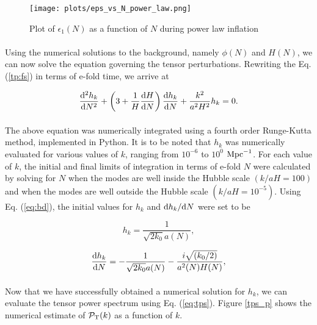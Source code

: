 \documentclass[12pt,a4paper,oneside]{book}
\begin{document}
\begin{figure}
\begin{center}
\texttt{[image: plots/eps\_vs\_N\_power\_law.png]}
\caption[Plot of $\epsilon_1(N)$ as a function of $N$ during power law inflation]{Plot of $\epsilon_1(N)$ as a function of $N$ during power law inflation}
\label{epsilon_p}
\end{center}
\end{figure}

\paragraph*{} Using the numerical solutions to the background, namely $\phi(N)$ and $H(N)$, we can now solve the equation 
governing the tensor perturbations. Rewriting the Eq. (\ref{tp:fs}) in terms of e-fold time, we arrive at

\begin{equation}\label{eq:temp2}
\frac{{\rm d}^2h_k}{{\rm d}N^2} +\left (3+\frac{1}{H}\frac{{\rm d}H}{{\rm d}N}\right)\frac{{\rm d}h_k}{{\rm d}N} + \frac{k^2}{a^2H^2}h_k = 0.
\end{equation}

\paragraph*{} The above equation was numerically integrated using a fourth order Runge-Kutta method, implemented in Python. 
It is to be noted that $h_k$ was numerically evaluated for various values of $k$, ranging from $10^{-6}$ to $10^{0}$ ${\rm Mpc}^{-1}$. 
For each value of $k$, the initial and final limits of integration in terms of e-fold $N$ were calculated by solving for $N$ when the 
modes are well inside the Hubble scale $(k/aH =  100)$ and when the modes are well outside the Hubble scale $(k/aH =  10^{-5})$. 
Using Eq. (\ref{eq:bd}), the initial values for $h_k$ and ${\rm d}h_k/{\rm d}N$ were set to be

\begin{equation}
h_k  = \frac{1}{\sqrt{2k_0}a(N)},
\end{equation}

\begin{equation}
\frac{{\rm d}h_k}{{\rm d}N} = -\frac{1}{\sqrt{2k_0}a(N)} - \frac{i\sqrt{(k_0/2)}}{a^2(N)H(N)},
\end{equation}

\paragraph*{} Now that we have successfully obtained a numerical solution for $h_k$, 
we can evaluate the tensor power spectrum using Eq. (\ref{eq:tps}). Figure \ref{tps_p} 
shows the numerical estimate of $\mathcal{P}_{\rm T}(k)$ as a function of $k$.
\end{document}
